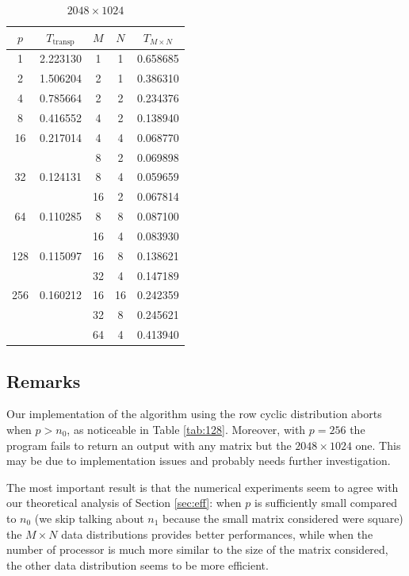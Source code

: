 \documentclass[a4paper,11pt]{article}
\begin{document}
\begin{table}[H]
\begin{center}
\begin{tabular}{|cc|ccc|}
\hline
$p$ & $T_\text{transp}$ & $M$ & $N$ & $ T_{M \times N}$ \\ \hline
1 & 2.223130 & 1 & 1 & 0.658685 \\ \hline
2 & 1.506204 & 2 & 1 & 0.386310 \\ \hline
4 & 0.785664 & 2 & 2 & 0.234376 \\ \hline
8 & 0.416552 & 4 & 2 & 0.138940 \\ \hline
16 & 0.217014 & 4 & 4 & 0.068770 \\
 & & 8 & 2 & 0.069898 \\ \hline
32 & 0.124131 & 8 & 4 & 0.059659 \\
& & 16 & 2 & 0.067814 \\ \hline
64 & 0.110285 & 8 & 8 & 0.087100 \\
& & 16 & 4 & 0.083930 \\ \hline
128 & 0.115097 & 16 & 8 & 0.138621 \\
& & 32 & 4 & 0.147189 \\ \hline
256 & 0.160212 & 16 & 16 & 0.242359 \\
& & 32 & 8 & 0.245621 \\
& & 64 & 4 & 0.413940 \\ \hline
\end{tabular}
\caption{$2048 \times 1024$} \label{tab:2048x1024}
\end{center}
\end{table}

\subsection{Remarks}

Our implementation of the algorithm using the row cyclic distribution aborts when $p>n_0$, as noticeable in Table \ref{tab:128}. Moreover, with $p=256$ the program fails to return an output with any matrix but the $2048 \times 1024$ one. This may be due to implementation issues and probably needs further investigation.

The most important result is that the numerical experiments seem to agree with our theoretical analysis of Section \ref{sec:eff}: when $p$ is sufficiently small compared to $n_0$ (we skip talking about $n_1$ because the small matrix considered were square) the $M \times N$ data distributions provides better performances, while when the number of processor is much more similar to the size of the matrix considered, the other data distribution seems to be more efficient.
\end{document}
